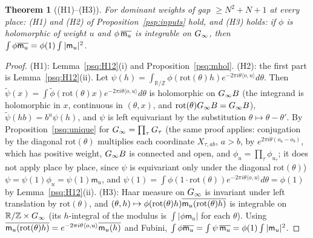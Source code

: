 \documentclass[10pt]{amsart}
\newtheorem{theorem}{Theorem}[section]
\theoremstyle{definition}
\theoremstyle{remark}
\newcommand{\R}{\mathbb R}
\newcommand{\Z}{\mathbb Z}
\providecommand{\psvac}{\mathbf v}
\begin{document}
\begin{theorem}[(H1)--(H3)]\label{psq:H123}
For dominant weights of gap $\ge N^2+N+1$ at every place: \textup{(H1)} and \textup{(H2)} of
Proposition~\ref{psp:inputs} hold, and \textup{(H3)} holds: if $\phi$ is holomorphic of weight $u$ and
$\phi\,\aubar{\mathsf m_u}$ is integrable on $\pspG$, then $\int\phi\aubar{\mathsf m_u}=\phi(1)\int|\mathsf
m_u|^2$.
\end{theorem}
\begin{proof}
(H1): Lemma~\ref{psq:H12}(i) and Proposition~\ref{psq:mhol}. (H2): the first part is
Lemma~\ref{psq:H12}(ii). Let $\psi(h)=\int_{\R/\Z}\phi(\mathrm{rot}(\theta)h)e^{-2\pi i\theta\langle o,u
\rangle}d\theta$. Then $\tilde\psi(x)=\int\tilde\phi(\mathrm{rot}(\theta)x)e^{-2\pi i\theta\langle o,u\rangle}
d\theta$ is holomorphic on $\pspG B$ (the integrand is holomorphic in $x$, continuous in $(\theta,x)$, and
$\mathrm{rot}(\theta)\pspG B=\pspG B$), $\tilde\psi(hb)=b^u\psi(h)$, and $\psi$ is left equivariant by the
substitution $\theta\mapsto\theta-\theta'$. By Proposition~\ref{psq:unique} for $\pspG=\prod_\tau G_\tau$ (the same proof applies:
conjugation by the diagonal $\mathrm{rot}(\theta)$ multiplies each coordinate $X_{\tau,ab}$, $a>b$, by
$e^{2\pi i\theta(o_a-o_b)}$, which has positive weight, $\pspG B$ is connected and open, and
$\phi_u=\prod_\tau\phi_{u_\tau}$; it does not apply place by place, since $\psi$ is equivariant only under
the diagonal $\mathrm{rot}(\theta)$) $\psi=\psi(1)\phi_u=\psi(1)\mathsf m_u$, and $\psi(1)=\int\phi(1\cdot\mathrm{rot}(\theta))
e^{-2\pi i\theta\langle o,u\rangle}d\theta=\phi(1)$ by Lemma~\ref{psq:H12}(ii). (H3): Haar measure on $\pspG$
is invariant under left translation by $\mathrm{rot}(\theta)$, and
$(\theta,h)\mapsto\phi(\mathrm{rot}(\theta)h)\aubar{\mathsf m_u(\mathrm{rot}(\theta)h)}$ is integrable on
$\R/\Z\times\pspG$ (its $h$-integral of the modulus is $\int|\phi\mathsf m_u|$ for each $\theta$). Using
$\aubar{\mathsf m_u(\mathrm{rot}(\theta)h)}=e^{-2\pi i\theta\langle o,u\rangle}\aubar{\mathsf m_u(h)}$ and
Fubini, $\int\phi\aubar{\mathsf m_u}=\int\psi\,\aubar{\mathsf m_u}=\phi(1)\int|\mathsf m_u|^2$.
\end{proof}




\providecommand{\auO}{\mathcal O}
\providecommand{\auU}{\mathrm U}
\providecommand{\auGL}{\mathrm{GL}}
\providecommand{\auA}{\mathbb A}
\providecommand{\aubar}[1]{\overline{#1}}
\providecommand{\pspG}{G_\infty}
\providecommand{\pspm}{\mathsf m}
\providecommand{\pcMat}{\mathrm M}
\providecommand{\psvac}{{\phi^{\mathrm{vac}}}}
\providecommand{\psZ}{Z}
\providecommand{\psrR}{\mathcal R}
\providecommand{\psrmc}{\mathsf{mc}}
\providecommand{\psrm}{\mathfrak m}
\providecommand{\psrF}{\mathbb F}
\end{document}
